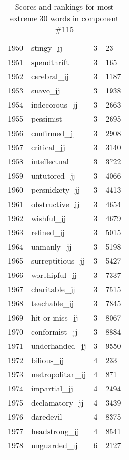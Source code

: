 \begin{longtable}[!htbp]{| rlr@{.}l |}
    1950 & stingy\_jj & 3 & 23 \\
    1951 & spendthrift & 3 & 165 \\
    1952 & cerebral\_jj & 3 & 1187 \\
    1953 & suave\_jj & 3 & 1938 \\
    1954 & indecorous\_jj & 3 & 2663 \\
    1955 & pessimist & 3 & 2695 \\
    1956 & confirmed\_jj & 3 & 2908 \\
    1957 & critical\_jj & 3 & 3140 \\
    1958 & intellectual & 3 & 3722 \\
    1959 & untutored\_jj & 3 & 4066 \\
    1960 & persnickety\_jj & 3 & 4413 \\
    1961 & obstructive\_jj & 3 & 4654 \\
    1962 & wishful\_jj & 3 & 4679 \\
    1963 & refined\_jj & 3 & 5015 \\
    1964 & unmanly\_jj & 3 & 5198 \\
    1965 & surreptitious\_jj & 3 & 5427 \\
    1966 & worshipful\_jj & 3 & 7337 \\
    1967 & charitable\_jj & 3 & 7515 \\
    1968 & teachable\_jj & 3 & 7845 \\
    1969 & hit-or-miss\_jj & 3 & 8067 \\
    1970 & conformist\_jj & 3 & 8884 \\
    1971 & underhanded\_jj & 3 & 9550 \\
    1972 & bilious\_jj & 4 & 233 \\
    1973 & metropolitan\_jj & 4 & 871 \\
    1974 & impartial\_jj & 4 & 2494 \\
    1975 & declamatory\_jj & 4 & 3439 \\
    1976 & daredevil & 4 & 8375 \\
    1977 & headstrong\_jj & 4 & 8541 \\
    1978 & unguarded\_jj & 6 & 2127 \\
    \hline
    \caption{Scores and rankings for most extreme 30 words in component \#115} \\
\end{longtable}
